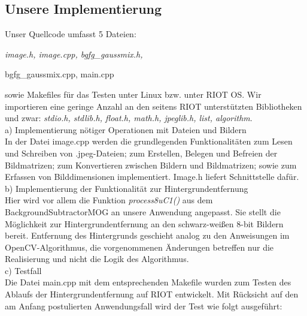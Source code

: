 \documentclass[10pt,a4paper]{article}
\begin{document}
\subsection{Unsere Implementierung}

Unser Quellcode umfasst 5 Dateien: {\it image.h, image.cpp, bgfg\_gaussmix.h,

 bgfg\_gaussmix.cpp, main.cpp} sowie Makefiles für das Testen unter Linux bzw. unter RIOT OS. Wir importieren eine geringe Anzahl an den seitens RIOT unterstützten Bibliotheken und zwar: {\it stdio.h, stdlib.h, float.h, math.h, jpeglib.h, list, algorithm}. \\

a) Implementierung nötiger Operationen mit Dateien und Bildern \\

In der Datei image.cpp werden die grundlegenden Funktionalitäten zum Lesen und Schreiben von .jpeg-Dateien; zum Erstellen, Belegen und Befreien der Bildmatrizen; zum Konvertieren zwischen Bildern und Bildmatrizen; sowie zum Erfassen von Bilddimensionen implementiert. Image.h liefert Schnittstelle dafür. \\

b) Implementierung der Funktionalität zur Hintergrundentfernung \\

Hier wird vor allem die Funktion {\it process8uC1()} aus dem BackgroundSubtractorMOG an unsere Anwendung angepasst. Sie stellt die Möglichkeit zur Hintergrundentfernung an den schwarz-weißen 8-bit Bildern bereit. Entfernung des Hintergrunds geschieht analog zu den Anweisungen im OpenCV-Algorithmus, die vorgenommenen Änderungen betreffen nur die Realisierung und nicht die Logik des Algorithmus. \\

c) Testfall \\

Die Datei main.cpp mit dem entsprechenden Makefile wurden zum Testen des Ablaufs der Hintergrundentfernung auf RIOT entwickelt. Mit Rücksicht auf den am Anfang postulierten Anwendungsfall wird der Test wie folgt ausgeführt:
\end{document}
